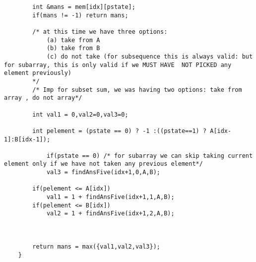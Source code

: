 \begin{solution}
\begin{verbatim}
        int &mans = mem[idx][pstate];
        if(mans != -1) return mans;
        
        /* at this time we have three options:
            (a) take from A
            (b) take from B
            (c) do not take (for subsequence this is always valid: but for subarray, this is only valid if we MUST HAVE  NOT PICKED any element previously)
        */
        /* Imp for subset sum, we was having two options: take from array , do not array*/
        
        int val1 = 0,val2=0,val3=0;
        
        int pelement = (pstate == 0) ? -1 :((pstate==1) ? A[idx-1]:B[idx-1]);
        
            if(pstate == 0) /* for subarray we can skip taking current element only if we have not taken any previous element*/
            val3 = findAnsFive(idx+1,0,A,B);
        
        if(pelement <= A[idx])
            val1 = 1 + findAnsFive(idx+1,1,A,B);
        if(pelement <= B[idx])
            val2 = 1 + findAnsFive(idx+1,2,A,B);
        
        
        
        return mans = max({val1,val2,val3});
    }
    \end{verbatim}
\end{solution}